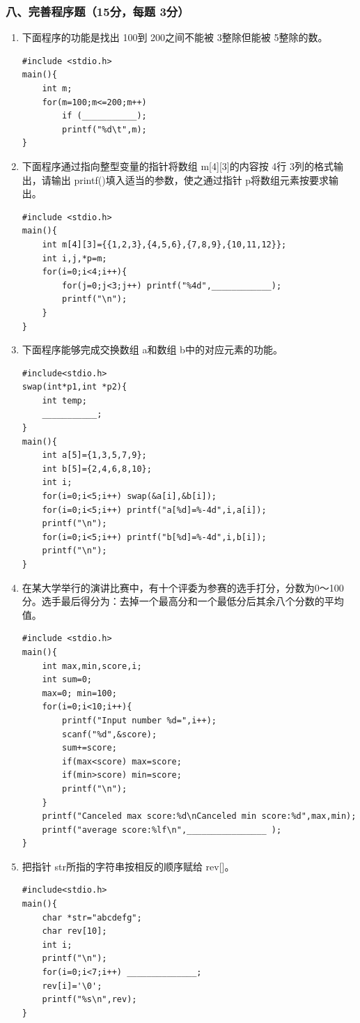 \documentclass[12pt,a4paper]{article}
\begin{document}
\subsubsection*{八、完善程序题（15分，每题 3分）}
\begin{enumerate}
    \item 下面程序的功能是找出 100到 200之间不能被 3整除但能被 5整除的数。
    \begin{verbatim}
#include <stdio.h>
main(){
    int m;
    for(m=100;m<=200;m++)
        if (___________);
        printf("%d\t",m);
}
    \end{verbatim}
    
    \item 下面程序通过指向整型变量的指针将数组 m[4][3]的内容按 4行 3列的格式输出，请输出 printf()填入适当的参数，使之通过指针 p将数组元素按要求输出。
    \begin{verbatim}
#include <stdio.h>
main(){
    int m[4][3]={{1,2,3},{4,5,6},{7,8,9},{10,11,12}};
    int i,j,*p=m;
    for(i=0;i<4;i++){
        for(j=0;j<3;j++) printf("%4d",____________);
        printf("\n");
    }
}
    \end{verbatim}
    
    \item 下面程序能够完成交换数组 a和数组 b中的对应元素的功能。
    \begin{verbatim}
#include<stdio.h>
swap(int*p1,int *p2){
    int temp;
    ___________;
}
main(){
    int a[5]={1,3,5,7,9};
    int b[5]={2,4,6,8,10};
    int i;
    for(i=0;i<5;i++) swap(&a[i],&b[i]);
    for(i=0;i<5;i++) printf("a[%d]=%-4d",i,a[i]);
    printf("\n");
    for(i=0;i<5;i++) printf("b[%d]=%-4d",i,b[i]);
    printf("\n");
}
    \end{verbatim}
    
    \item 在某大学举行的演讲比赛中，有十个评委为参赛的选手打分，分数为0～100分。选手最后得分为：去掉一个最高分和一个最低分后其余八个分数的平均值。
    \begin{verbatim}
#include <stdio.h>
main(){
    int max,min,score,i;
    int sum=0;
    max=0; min=100;
    for(i=0;i<10;i++){
        printf("Input number %d=",i++);
        scanf("%d",&score);
        sum+=score;
        if(max<score) max=score;
        if(min>score) min=score;
        printf("\n");
    }
    printf("Canceled max score:%d\nCanceled min score:%d",max,min);
    printf("average score:%lf\n",________________ );
}
    \end{verbatim}
    
    \item 把指针 str所指的字符串按相反的顺序赋给 rev[]。
    \begin{verbatim}
#include<stdio.h>
main(){
    char *str="abcdefg";
    char rev[10];
    int i;
    printf("\n");
    for(i=0;i<7;i++) ______________;
    rev[i]='\0';
    printf("%s\n",rev);
}
    \end{verbatim}
\end{enumerate}
\end{document}
